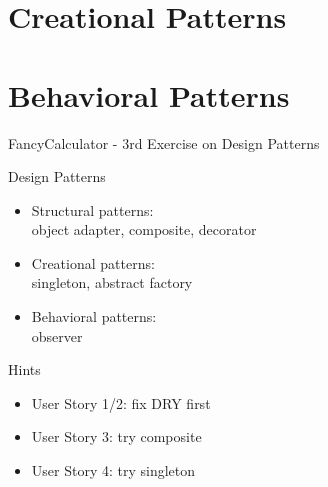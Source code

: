 \section{Creational Patterns}


\section{Behavioral Patterns}


\begin{frame}
	\begin{fancycolumns}[widths={65}]
		\begin{example}{FancyCalculator - 3rd Exercise on Design Patterns}
			\begin{itemize}
				\userstoriesA
				\userstoriesB
				\userstoriesC
			\end{itemize}
		\end{example}
	\nextcolumn
		\begin{definition}{Design Patterns}
			\begin{itemize}
				\item Structural patterns:\\object adapter, composite, decorator
				\item Creational patterns:\\singleton, abstract factory
				\item Behavioral patterns:\\observer
			\end{itemize}
		\end{definition}
		\begin{note}{Hints}
			\begin{itemize}
				\item User Story 1/2: fix DRY first
				\item User Story 3: try composite
				\item User Story 4: try singleton
			\end{itemize}
		\end{note}
	\end{fancycolumns}
\end{frame}



